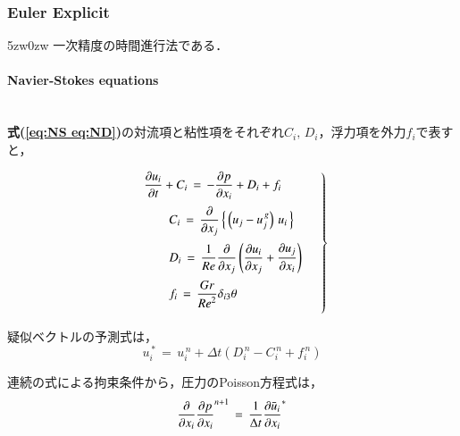 \subsubsection{Euler Explicit}
\begin{indentation}{5zw}{0zw}
一次精度の時間進行法である．

\paragraph{Navier-Stokes equations} $\mbox{}$\\
\textbf{式(\ref{eq:NS eq:ND})}の対流項と粘性項をそれぞれ$C_i,\,D_i$，浮力項を外力$f_i$で表すと，

\begin{equation}
\left.
\begin{array}{l}
\vspace{2mm}
\displaystyle{ \frac{\partial u_i}{\partial t} + C_i \,=\, - \frac{\partial p}{\partial x_i} + D_i + f_i } \\
\vspace{2mm}
\qquad \displaystyle{ C_i \,=\, \frac{\partial}{\partial x_j} \left\{ \, \left( u_j - u_j^{\,g} \right) \, u_i \, \right\} } \\
\vspace{2mm}
\qquad \displaystyle{ D_i \,=\, \frac{1}{Re}\frac{\partial}{\partial x_j} \left( \frac{\partial u_i}{\partial x_j} + \frac{\partial u_j}{\partial x_i} \right) } \\
\vspace{2mm}
\qquad \displaystyle{ f_i \,=\, \frac{Gr}{{Re}^2} \delta_{i3} \theta } \\
\end{array} \quad \right \}
\label{eq:NS eq CDf}
\end{equation}

\noindent 疑似ベクトルの予測式は，
\begin{equation}
u_i^{\,*} \,=\, u_i^{\,n} + \Delta t \left( D_i^{\,n} - C_i^{\,n} + f_i^{\,n} \right)
\label{eq:pseudo vector EE}
\end{equation}

\noindent 連続の式による拘束条件から，圧力のPoisson方程式は，
\begin{equation}
\frac{\partial}{\partial x_i} {\frac{\partial p}{\partial x_i}}^{n+1}
\,=\,
\frac{1}{\Delta t} {\frac{\partial \bar{u}_i}{\partial x_i}}^* \vspace{1mm}
\label{eq:Poisson eq}
\end{equation}


\end{indentation}
